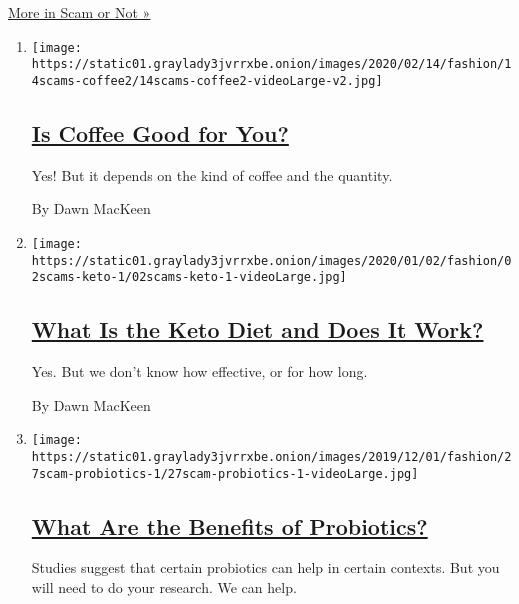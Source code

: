 \href{/column/scam-or-not}{More in Scam or Not »}

\begin{enumerate}
\def\labelenumi{\arabic{enumi}.}
\item
  \texttt{[image: https://static01.graylady3jvrrxbe.onion/images/2020/02/14/fashion/14scams-coffee2/14scams-coffee2-videoLarge-v2.jpg]}

  \hypertarget{is-coffee-good-for-you}{%
  \subsection{\texorpdfstring{\href{/2020/02/13/style/self-care/coffee-benefits.html}{Is
  Coffee Good for
  You?}}{Is Coffee Good for You?}}\label{is-coffee-good-for-you}}

  Yes! But it depends on the kind of coffee and the quantity.

  By Dawn MacKeen
\item
  \texttt{[image: https://static01.graylady3jvrrxbe.onion/images/2020/01/02/fashion/02scams-keto-1/02scams-keto-1-videoLarge.jpg]}

  \hypertarget{what-is-the-keto-diet-and-does-it-work}{%
  \subsection{\texorpdfstring{\href{/2020/01/02/style/self-care/keto-diet-explained-benefits.html}{What
  Is the Keto Diet and Does It
  Work?}}{What Is the Keto Diet and Does It Work?}}\label{what-is-the-keto-diet-and-does-it-work}}

  Yes. But we don't know how effective, or for how long.

  By Dawn MacKeen
\item
  \texttt{[image: https://static01.graylady3jvrrxbe.onion/images/2019/12/01/fashion/27scam-probiotics-1/27scam-probiotics-1-videoLarge.jpg]}

  \hypertarget{what-are-the-benefits-of-probiotics}{%
  \subsection{\texorpdfstring{\href{/2019/11/27/style/self-care/probiotics-benefits.html}{What
  Are the Benefits of
  Probiotics?}}{What Are the Benefits of Probiotics?}}\label{what-are-the-benefits-of-probiotics}}

  Studies suggest that certain probiotics can help in certain contexts.
  But you will need to do your research. We can help.


\end{enumerate}
